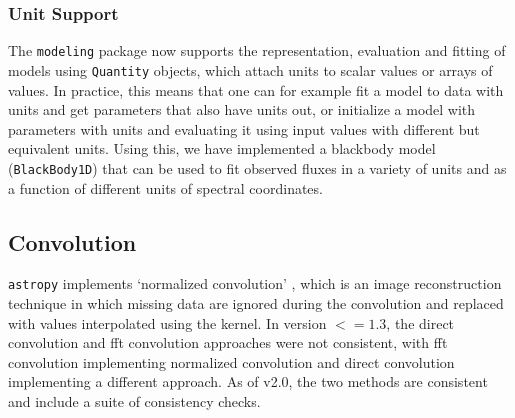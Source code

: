 \documentclass[modern]{aastex61}
\newcommand{\package}[1]{\texttt{#1}\xspace}
\newcommand{\astropypkg}{\package{astropy}\xspace}
\begin{document}
\subsubsection{Unit Support}

The \package{modeling} package now supports the representation, evaluation and fitting of models using \texttt{Quantity} objects, which attach units to scalar values or arrays of values. In practice, this means that one can for example fit a model to data with units and get parameters that also have units out, or initialize a model with parameters with units and evaluating it using input values with different but equivalent units. Using this, we have implemented a blackbody model (\texttt{BlackBody1D}) that can be used to fit observed fluxes in a variety of units and as a function of different units of spectral coordinates.

\subsection{Convolution}

\astropypkg implements `normalized convolution' \citep[e.g.,][]{Knutsson1993}, which is an image reconstruction technique in which missing data are ignored during the convolution and replaced with values interpolated using the kernel.   In version $<=1.3$, the direct convolution and fft convolution approaches were not consistent, with fft convolution implementing normalized convolution and direct convolution implementing a different approach.  As of v2.0, the two methods are consistent and include a suite of consistency checks.
\end{document}
